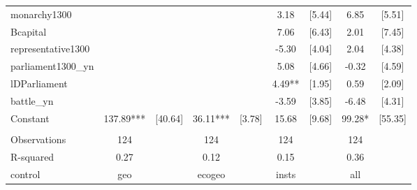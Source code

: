 \documentclass[landscape]{article}
\begin{document}
\begin{tabular}{lcccccccc}
monarchy1300 &  &  &  &  & 3.18 & [5.44] & 6.85 & [5.51] \\
Bcapital &  &  &  &  & 7.06 & [6.43] & 2.01 & [7.45] \\
representative1300 &  &  &  &  & -5.30 & [4.04] & 2.04 & [4.38] \\
parliament1300\_yn &  &  &  &  & 5.08 & [4.66] & -0.32 & [4.59] \\
lDParliament &  &  &  &  & 4.49** & [1.95] & 0.59 & [2.09] \\
battle\_yn &  &  &  &  & -3.59 & [3.85] & -6.48 & [4.31] \\
Constant & 137.89*** & [40.64] & 36.11*** & [3.78] & 15.68 & [9.68] & 99.28* & [55.35] \\
 &  &  &  &  &  &  &  &  \\
Observations & 124 &  & 124 &  & 124 &  & 124 &  \\
R-squared & 0.27 &  & 0.12 &  & 0.15 &  & 0.36 &  \\
 control & geo &  & ecogeo &  & insts &  & all &  \\ \hline
\end{tabular}
\end{document}
